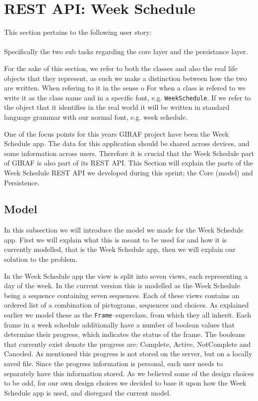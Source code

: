\section{REST API: Week Schedule}\label{sec:restws}
This section pertains to the following user story: \\
 \\
Specifically the two sub tasks regarding the core layer and the persistance layer.

For the sake of this section, we refer to both the classes and also the real life objects that they represent, as such we make a distinction between how the two are written.
When refering to it in the sense o
For when a class is refered to we write it as the class name and in a specific font, e.g. \texttt{WeekSchedule}.
If we refer to the object that it identifies in the real world it will be written in standard language grammar with our normal font, e.g. week schedule.

\noindent
One of the focus points for this years GIRAF project have been the Week Schedule app.
The data for this application should be shared across devices, and some information across users.
Therefore it is crucial that the Week Schedule part of GIRAF is also part of its REST API.
This Section will explain the parts of the Week Schedule REST API we developed during this sprint; the Core (model) and Persistence. 

\subsection{Model}
In this subsection we will introduce the model we made for the Week Schedule app.
First we will explain what this is meant to be used for and how it is currently modelled, that is the Week Schedule app, then we will explain our solution to the problem. 

In the Week Schedule app the view is split into seven views, each representing a day of the week.
In the current version this is modelled as the Week Schedule being a sequence containing seven sequences.
Each of these views contains an ordered list of a combination of pictograms, sequences and choices.
As explained earlier we model these as the \texttt{Frame}--superclass, from which they all inherit. %
Each frame in a week schedule additionally have a number of boolean values that determine their progress, which indicates the status of the frame. 
The booleans that currently exist denote the progress are: Complete, Active, NotComplete and Canceled. 
As mentioned this progress is not stored on the server, but on a locally saved file.
Since the progress information is personal, each user needs to separately have this information stored. 
As we believed some of the design choices to be odd, for our own design choices we decided to base it upon how the Week Schedule app is used, and disregard the current model.

